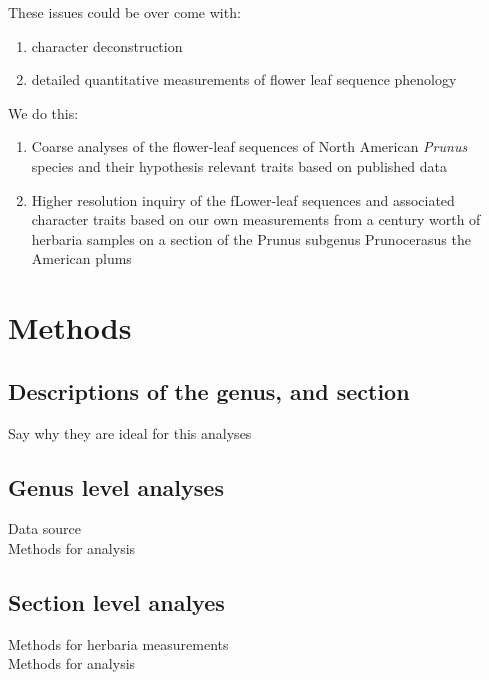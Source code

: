 \documentclass{article}\usepackage[]{graphicx}\usepackage[]{color}
\begin{document}
These issues could be over come with:
\begin{enumerate}
\item character deconstruction
\item detailed quantitative measurements of flower leaf sequence phenology
\end{enumerate}

We do this:
\begin{enumerate}
\item Coarse analyses of the flower-leaf sequences of North American \textit{Prunus} species and their hypothesis relevant traits based on published data
\item Higher resolution inquiry of the fLower-leaf sequences and associated character traits based on our own measurements from a century worth of herbaria samples on a section of the Prunus subgenus Prunocerasus the American plums
\end{enumerate}

\section*{Methods}
\subsection{Descriptions of the genus, and section}
Say why they are ideal for this analyses
\subsection{Genus level analyses}
Data source\\
Methods for analysis\\

\subsection{Section level analyes}
Methods for herbaria measurements\\
Methods for analysis\\
\end{document}
